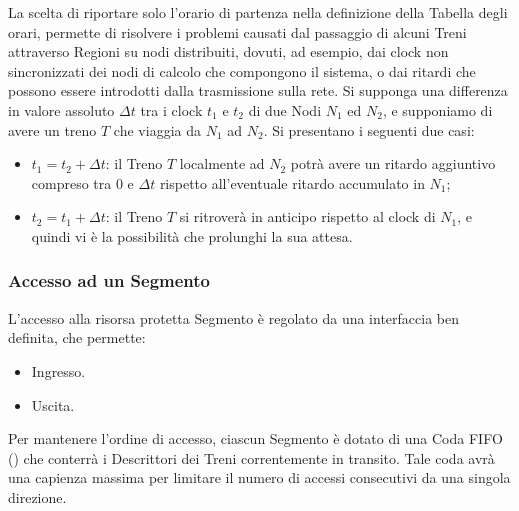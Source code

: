 	La scelta di riportare solo l'orario di partenza nella definizione della Tabella degli orari, permette di risolvere i problemi causati dal passaggio di alcuni Treni attraverso Regioni su nodi distribuiti, dovuti, ad esempio, dai clock non sincronizzati dei nodi di calcolo che compongono il sistema, o dai ritardi che possono essere introdotti dalla trasmissione sulla rete. Si supponga una differenza in valore assoluto $\Delta t$ tra i clock $t_1$ e $t_2$ di due Nodi $N_1$ ed $N_2$, e supponiamo di avere un treno $T$ che viaggia da $N_1$ ad $N_2$. Si presentano i seguenti due casi:
	
	\begin{itemize}
		\item $t_1 = t_2+\Delta t$: il Treno $T$ localmente ad $N_2$ potrà avere un ritardo aggiuntivo compreso tra $0$ e $\Delta t$ rispetto all'eventuale ritardo accumulato in $N_1$;
		\item $t_2 = t_1+\Delta t$: il Treno $T$ si ritroverà in anticipo rispetto al clock di $N_1$, e quindi vi è la possibilità che prolunghi la sua attesa.
	\end{itemize}
	
	
	
		\subsubsection{Accesso ad un Segmento}\label{subsubsec:segment_access}
		
		L'accesso alla risorsa protetta Segmento è regolato da una interfaccia ben definita, che permette:
			\begin{itemize}
				\item Ingresso.
				\item Uscita.
			\end{itemize}
		Per mantenere l'ordine di accesso, ciascun Segmento è dotato di una Coda FIFO () che conterrà i Descrittori dei Treni correntemente in transito. Tale coda avrà una capienza massima per limitare il numero di accessi consecutivi da una singola direzione. 
		
